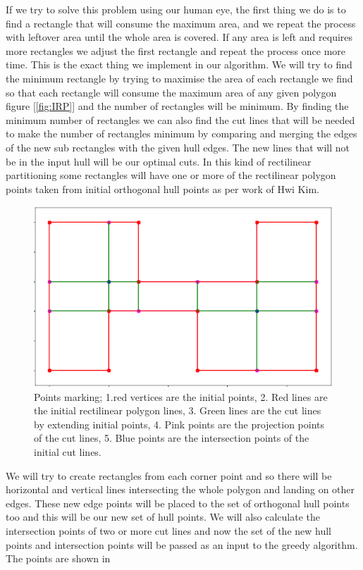 \documentclass[a4paper,17pt]{article}
\begin{document}
If we try to solve this problem using our human eye, the first thing we do is to find a rectangle that will consume the maximum area, and we repeat the process with leftover area until the whole area is covered. If any area is left and requires more rectangles we adjust the first rectangle and repeat the process once more time. This is the exact thing we implement in our algorithm. 
We will try to find the minimum rectangle by trying to maximise the area of each rectangle we find so that each rectangle will consume the maximum area of any given polygon figure [\ref{fig:IRP}] and the number of rectangles will be minimum. By finding the minimum number of rectangles we can also find the cut lines that will be needed to make the number of rectangles minimum by comparing and merging the edges of the new sub rectangles with the given hull edges. The new lines that will not be in the input hull will be our optimal cuts.  In this kind of rectilinear partitioning some rectangles will have one or more of the rectilinear polygon points taken from initial orthogonal hull points as per work of Hwi Kim\cite{https://doi.org/10.48550/arxiv.2111.01970}. 

\begin{figure}[!h]
\centering
\includegraphics[width=1\textwidth]{points-marked.png}
\caption{Points marking; 1.red vertices are the initial points, 2. Red lines are the initial rectilinear polygon lines, 3. Green lines are the cut lines by extending initial points, 4. Pink points are the projection points of the cut lines, 5. Blue points are the intersection points of the initial cut lines.}
\label{fig:PM}
\end{figure}

We will try to create rectangles from each corner point and so there will be horizontal and vertical lines intersecting the whole polygon and landing on other edges. These new edge points will be placed to the set of orthogonal hull points too and this will be our new set of hull points. We will also calculate the intersection points of two or more cut lines and now the set of the new hull points and intersection points will be passed as an input to the greedy algorithm. The points are shown in \figureautorefname[\ref{fig:PM}]
\end{document}
